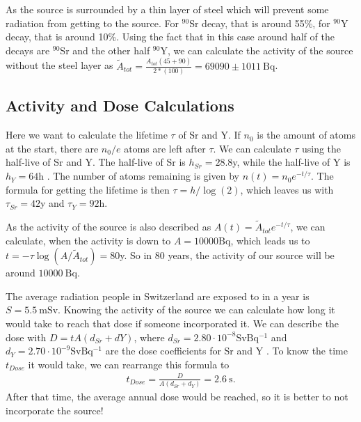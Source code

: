 As the source is surrounded by a thin layer of steel which will prevent some radiation from getting to the source.
For $^{90}$Sr decay, that is around 55\%, for $^{90}$Y decay, that is around 10\%.
Using the fact that in this case around half of the decays are $^{90}$Sr and the other half $^{90}$Y, we can calculate the activity of the source without the steel layer as ${\tilde{A}_{tot}} = \frac{A_{tot} (45 + 90)}{2*(100)} = 69090 \pm \SI{1011}{\becquerel}$.

\subsection{Activity and Dose Calculations}
Here we want to calculate the lifetime $\tau$ of Sr and Y. 
If $n_0$ is the amount of atoms at the start, there are $n_0/e$ atoms are left after $\tau$.
We can calculate $\tau$ using the half-live of Sr and Y.
The half-live of Sr is $h_{Sr} = 28.8$y, while the half-live of Y is $h_Y = 64$h \cite{manual}.
The number of atoms remaining is given by $n(t) = n_0 e^{-t/\tau}$.
The formula for getting the lifetime is then $\tau = h/\log(2)$, which leaves us with $\tau_{Sr} = 42$y and $\tau_Y = 92$h.

As the activity of the source is also described as $A(t) =  \tilde{A}_{tot} e^{-t/\tau}$, we can calculate, when the activity is down to $A = 10000 \si{\becquerel}$, which leads us to $t = -\tau \log(A/\tilde{A}_{tot}) = 80$y.
So in $80$ years, the activity of our source will be around $\SI{10000}{\becquerel}$.

The average radiation people in Switzerland are exposed to in a year is $S = \SI{5.5}{\milli\sievert}$. Knowing the activity of the source we can calculate how long it would take to reach that dose if someone incorporated it.
We can describe the dose with $D = t A (d_{Sr} + d{Y})$, where $d_{Sr} = 2.80 \cdot 10^{-8} \si{\sievert \becquerel^{-1}}$ and $d_Y = 2.70 \cdot 10^{-9} \si{\sievert \becquerel^{-1}}$ are the dose coefficients for Sr and Y \cite{manual}.
To know the time $t_{Dose}$ it would take, we can rearrange this formula to
\begin{align*}
	t_{Dose} = \frac{D}{A(d_{Sr} + d_Y)} = \SI{2.6}{\second}.
\end{align*}
After that time, the average annual dose would be reached, so it is better to not incorporate the source!








